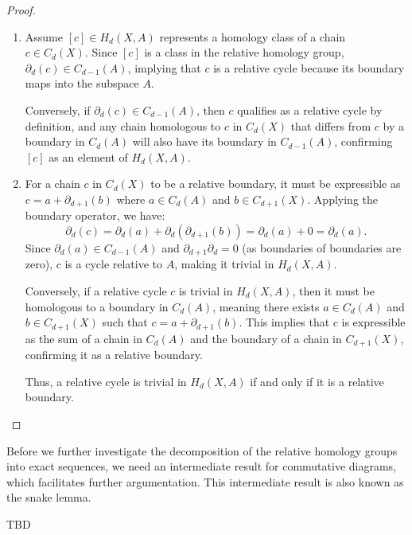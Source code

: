 \begin{proof}
	\begin{enumerate}
		\item Assume $[c] \in H_{d}(X,A)$ represents a homology class of a chain $c \in
			C_{d}(X)$. Since $[c]$ is a class in the relative homology group, $\partial
			_{d}(c) \in C_{d-1}(A)$, implying that $c$ is a relative cycle because its
			boundary maps into the subspace $A$.

			Conversely, if $\partial_{d}(c) \in C_{d-1}(A)$, then $c$ qualifies as a
			relative cycle by definition, and any chain homologous to $c$ in $C_{d}(X)$
			that differs from $c$ by a boundary in $C_{d}(A)$ will also have its boundary
			in $C_{d-1}(A)$, confirming $[c]$ as an element of $H_{d}(X,A)$.

		\item For a chain $c$ in $C_{d}(X)$ to be a relative boundary, it must be
			expressible as $c = a + \partial_{d+1}(b)$ where $a \in C_{d}(A)$ and
			$b \in C_{d+1}(X)$. Applying the boundary operator, we have:
			\[
				\partial_{d}(c) = \partial_{d}(a) + \partial_{d}(\partial_{d+1}(b)) = \partial
				_{d}(a) + 0 = \partial_{d}(a).
			\]
			Since $\partial_{d}(a) \in C_{d-1}(A)$ and $\partial_{d+1}\partial_{d} = 0$
			(as boundaries of boundaries are zero), $c$ is a cycle relative to $A$, making
			it trivial in $H_{d}(X,A)$.

			Conversely, if a relative cycle $c$ is trivial in $H_{d}(X,A)$, then it must
			be homologous to a boundary in $C_{d}(A)$, meaning there exists
			$a \in C_{d}(A)$ and $b \in C_{d+1}(X)$ such that
			$c = a + \partial_{d+1}(b)$. This implies that $c$ is expressible as the sum
			of a chain in $C_{d}(A)$ and the boundary of a chain in $C_{d+1}(X)$,
			confirming it as a relative boundary.

			Thus, a relative cycle is trivial in $H_{d}(X,A)$ if and only if it is a relative
			boundary.
	\end{enumerate}
\end{proof}

Before we further investigate the decomposition of the relative homology groups into exact sequences, we need an intermediate result for commutative diagrams, which facilitates further argumentation. This intermediate result is also known as the snake lemma.

\begin{lemma}
TBD
\label{snake}

\end{lemma}

